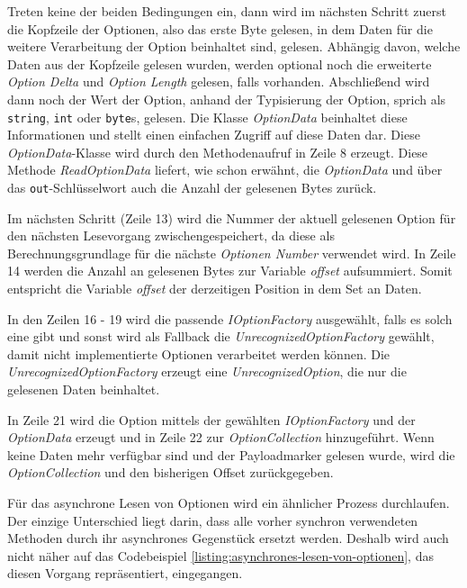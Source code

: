 Treten keine der beiden Bedingungen ein, dann wird im nächsten Schritt zuerst die Kopfzeile der Optionen, also das erste Byte gelesen, in dem Daten für die weitere Verarbeitung der Option beinhaltet sind, gelesen. Abhängig davon, welche Daten aus der Kopfzeile gelesen wurden, werden optional noch die erweiterte \textit{Option Delta} und \textit{Option Length} gelesen, falls vorhanden. Abschließend wird dann noch der Wert der Option, anhand der Typisierung der Option, sprich als \texttt{string}, \texttt{int} oder \texttt{byte}s, gelesen. Die Klasse \textit{OptionData} beinhaltet diese Informationen und stellt einen einfachen Zugriff auf diese Daten dar. Diese \textit{OptionData}-Klasse wird durch den Methodenaufruf in Zeile 8 erzeugt. Diese Methode \textit{ReadOptionData} liefert, wie schon erwähnt, die \textit{OptionData} und über das \texttt{out}-Schlüsselwort auch die Anzahl der gelesenen Bytes zurück.

Im nächsten Schritt (Zeile 13) wird die Nummer der aktuell gelesenen Option für den nächsten Lesevorgang zwischengespeichert, da diese als Berechnungsgrundlage für die nächste \textit{Optionen Number} verwendet wird. In Zeile 14 werden die Anzahl an gelesenen Bytes zur Variable \textit{offset} aufsummiert. Somit entspricht die Variable \textit{offset} der derzeitigen Position in dem Set an Daten.

In den Zeilen 16 - 19 wird die passende \textit{IOptionFactory} ausgewählt, falls es solch eine gibt und sonst wird als Fallback die \textit{UnrecognizedOptionFactory} gewählt, damit nicht implementierte Optionen verarbeitet werden können. Die \textit{UnrecognizedOptionFactory} erzeugt eine \textit{UnrecognizedOption}, die nur die gelesenen Daten beinhaltet.

In Zeile 21 wird die Option mittels der gewählten \textit{IOptionFactory} und der \textit{OptionData} erzeugt und in Zeile 22 zur \textit{OptionCollection} hinzugeführt. Wenn keine Daten mehr verfügbar sind und der Payloadmarker gelesen wurde, wird die \textit{OptionCollection} und den bisherigen Offset zurückgegeben.

Für das asynchrone Lesen von Optionen wird ein ähnlicher Prozess durchlaufen. Der einzige Unterschied liegt darin, dass alle vorher synchron verwendeten Methoden durch ihr asynchrones Gegenstück ersetzt werden. Deshalb wird auch nicht näher auf das Codebeispiel \ref{listing:asynchrones-lesen-von-optionen}, das diesen Vorgang repräsentiert, eingegangen.

